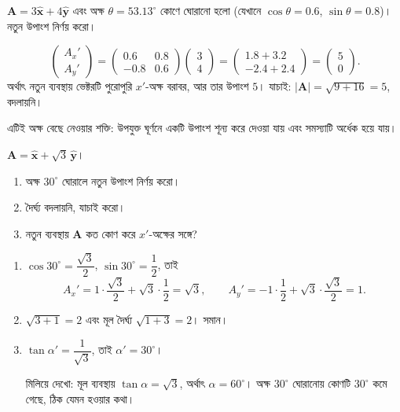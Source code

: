 \documentclass[11pt]{article}
\begin{document}
\begin{example}
$\mathbf{A} = 3\hat{\mathbf{x}} + 4\hat{\mathbf{y}}$ এবং অক্ষ
$\theta = 53.13^{\circ}$ কোণে ঘোরানো হলো (যেখানে $\cos\theta = 0.6$,
$\sin\theta = 0.8$)। নতুন উপাংশ নির্ণয় করো।
\end{example}

\begin{solbox}
\[
  \begin{pmatrix} A_{x}' \\ A_{y}' \end{pmatrix}
  = \begin{pmatrix} 0.6 & 0.8 \\ -0.8 & 0.6 \end{pmatrix}
  \begin{pmatrix} 3 \\ 4 \end{pmatrix}
  = \begin{pmatrix} 1.8+3.2 \\ -2.4+2.4 \end{pmatrix}
  = \begin{pmatrix} 5 \\ 0 \end{pmatrix} .
\]
অর্থাৎ নতুন ব্যবস্থায় ভেক্টরটি পুরোপুরি $x'$-অক্ষ বরাবর, আর তার উপাংশ
$5$। যাচাই: $|\mathbf{A}| = \sqrt{9+16} = 5$, বদলায়নি।

এটিই অক্ষ বেছে নেওয়ার শক্তি: উপযুক্ত ঘূর্ণনে একটি উপাংশ শূন্য করে দেওয়া যায়
এবং সমস্যাটি অর্ধেক হয়ে যায়।
\end{solbox}

 $\mathbf{A} = \hat{\mathbf{x}} + \sqrt{3}\,\hat{\mathbf{y}}$।
\begin{enumerate}
  \item অক্ষ $30^{\circ}$ ঘোরালে নতুন উপাংশ নির্ণয় করো।
  \item দৈর্ঘ্য বদলায়নি, যাচাই করো।
  \item নতুন ব্যবস্থায় $\mathbf{A}$ কত কোণ করে $x'$-অক্ষের সঙ্গে?
\end{enumerate}

\begin{sol}
\begin{enumerate}
  \item $\cos 30^{\circ} = \dfrac{\sqrt{3}}{2}$,
        $\sin 30^{\circ} = \dfrac{1}{2}$, তাই
        \[
          A_{x}' = 1 \cdot \frac{\sqrt{3}}{2} + \sqrt{3}\cdot\frac{1}{2}
          = \sqrt{3}, \qquad
          A_{y}' = -1 \cdot \frac{1}{2} + \sqrt{3}\cdot\frac{\sqrt{3}}{2}
          = 1 .
        \]
  \item $\sqrt{3+1} = 2$ এবং মূল দৈর্ঘ্য $\sqrt{1+3} = 2$। সমান।
  \item $\tan\alpha' = \dfrac{1}{\sqrt{3}}$, তাই $\alpha' = 30^{\circ}$।

        মিলিয়ে দেখো: মূল ব্যবস্থায় $\tan\alpha = \sqrt{3}$, অর্থাৎ
        $\alpha = 60^{\circ}$। অক্ষ $30^{\circ}$ ঘোরানোয় কোণটি
        $30^{\circ}$ কমে গেছে, ঠিক যেমন হওয়ার কথা।
\end{enumerate}
\end{sol}
\end{document}
